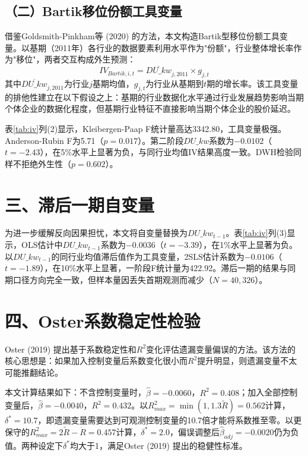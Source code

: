 \documentclass[11pt,a4paper]{article}
\begin{document}
\subsection*{（二）Bartik移位份额工具变量}

借鉴Goldsmith-Pinkham等 (2020) 的方法，本文构造Bartik型移位份额工具变量。以基期（2011年）各行业的数据要素利用水平作为"份额"，行业整体增长率作为"移位"，两者交互构成外生预测：
\begin{equation}
IV_{Bartik,i,t} = \overline{DU\_kw}_{j,2011} \times g_{j,t}
\end{equation}
其中$\overline{DU\_kw}_{j,2011}$为行业$j$基期均值，$g_{j,t}$为行业从基期到$t$期的增长率。该工具变量的排他性建立在以下假设之上：基期的行业数据化水平通过行业发展趋势影响当期个体企业的数据化程度，但基期行业特征不直接影响当期个体企业的股价延迟。

表\ref{tab:iv}列(2)显示，Kleibergen-Paap F统计量高达3342.80，工具变量极强。Anderson-Rubin F为5.71（$p=0.017$）。第二阶段$DU\_kw$系数为$-0.0102$（$t=-2.43$），在5\%水平上显著为负，与同行业均值IV结果高度一致。DWH检验同样不拒绝外生性（$p=0.602$）。

\section*{三、滞后一期自变量}

为进一步缓解反向因果担忧，本文将自变量替换为$DU\_kw_{t-1}$。表\ref{tab:iv}列(3)显示，OLS估计中$DU\_kw_{t-1}$系数为$-0.0036$（$t=-3.39$），在1\%水平上显著为负。以$DU\_kw_{t-1}$的同行业均值滞后值作为工具变量，2SLS估计系数为$-0.0106$（$t=-1.89$），在10\%水平上显著，一阶段F统计量为422.92。滞后一期的结果与同期口径方向完全一致，但样本量因丢失首期观测而减少（$N=40,326$）。

\section*{四、Oster系数稳定性检验}

Oster (2019) 提出基于系数稳定性和$R^2$变化评估遗漏变量偏误的方法。该方法的核心思想是：如果加入控制变量后系数变化很小而$R^2$提升明显，则遗漏变量不太可能推翻结论。

本文计算结果如下：不含控制变量时，$\hat{\beta}=-0.0060$，$R^2=0.408$；加入全部控制变量后，$\hat{\beta}=-0.0040$，$R^2=0.432$。以$R^2_{max}=\min(1, 1.3\tilde{R})=0.562$计算，$\delta^*=10.7$，即遗漏变量需要达到可观测控制变量的10.7倍才能将系数推至零。以更保守的$R^2_{max}=2\tilde{R}-\dot{R}=0.457$计算，$\delta^*=2.0$，偏误调整后$\hat{\beta}_{adj}=-0.0020$仍为负值。两种设定下$\delta^*$均大于1，满足Oster (2019) 提出的稳健性标准。
\end{document}
